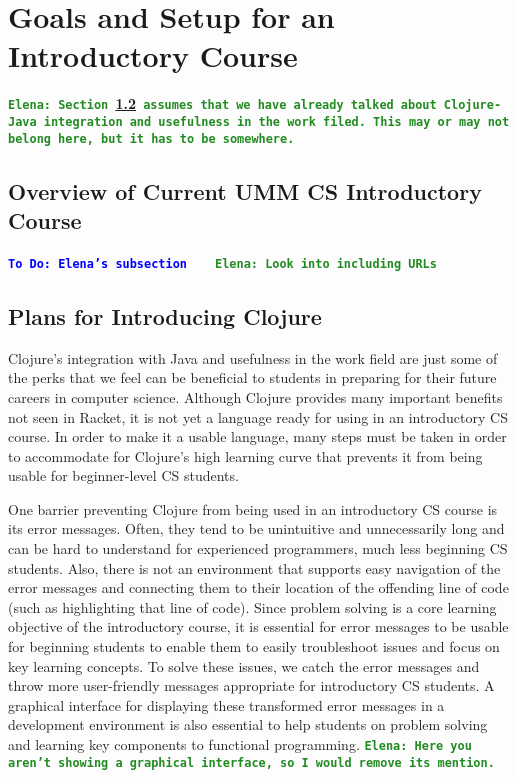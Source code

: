\documentclass[12pt]{article}
\newcommand{\comment}[1]{{\bf \tt  {#1}}}
\newcommand{\emcomment}[1]{\textcolor{ForestGreen}{\comment{Elena: {#1}}}}
\newcommand{\todo}[1]{\textcolor{blue}{\comment{To Do: {#1}}}}
\begin{document}
\section{Goals and Setup for an Introductory Course}\label{sec:racket-clojure}
\emcomment{Section~\ref{subsec:plans} assumes that we have already talked about Clojure-Java integration and usefulness in the work filed. This may or may not belong here, but it has to be somewhere.}

\subsection{Overview of Current UMM CS Introductory Course}\label{subsec:course}
\todo{Elena's subsection}
~\cite{htdp}
~\cite{lein} \emcomment{Look into including URLs}

\subsection{Plans for Introducing Clojure}\label{subsec:plans}
Clojure’s integration with Java and usefulness in the work field are just some of the perks that we feel can be beneficial to students in preparing for their future careers in computer science.  Although Clojure provides many important benefits not seen in Racket, it is not yet a language ready for using in an introductory CS course. In order to make it a usable language, many steps must be taken in order to accommodate for Clojure’s high learning curve that prevents it from being usable for beginner-level CS students.

One barrier preventing Clojure from being used in an introductory CS course is its error messages. Often, they tend to be unintuitive and unnecessarily long and can be hard to understand for experienced programmers, much less beginning CS students. Also, there is not an environment that supports easy navigation of the error messages and connecting them to their location of the offending line of code (such as highlighting that line of code). Since problem solving is a core learning objective of the introductory course, it is essential for error messages to be usable for beginning students to enable them to easily troubleshoot issues and focus on key learning concepts. To solve these issues, we catch the error messages and throw more user-friendly messages appropriate for introductory CS students.  A graphical interface for displaying these transformed error messages in a development environment is also essential to help students on problem solving and learning key components to functional programming.  \emcomment{Here you aren't showing a graphical interface, so I would remove its mention.}
\end{document}
